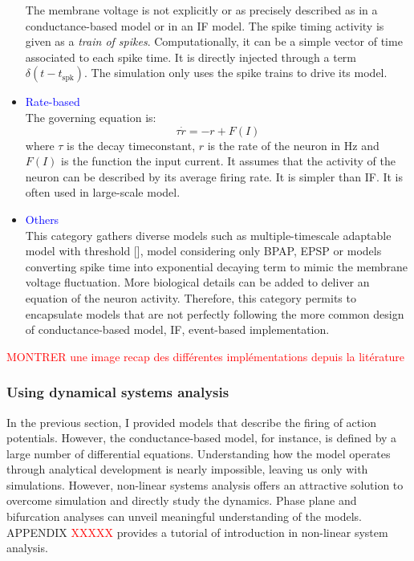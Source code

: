 \begin{itemize}
The membrane voltage is not explicitly or as precisely described as in a conductance-based model or in an \acrshort{IF} model. The spike timing activity is given as a \textit{train of spikes}. Computationally, it can be a simple vector of time associated to each spike time. It is directly injected through a term $\delta(t-t_{\mathrm{spk}})$. The simulation only uses the spike trains to drive its model. 
\item \textcolor{blue}{Rate-based}\\
The governing equation is: 
$$ \tau \dot{r} = - r + F(I)$$
where $\tau$ is the decay timeconstant, $r$ is the rate of the neuron in Hz and $F(I)$ is the function the input current. It assumes that the activity of the neuron can be described by its average firing rate. It is simpler than \acrshort{IF}. It is often used in large-scale model.
\item \textcolor{blue}{Others}\\
This category gathers diverse models such as multiple-timescale adaptable model with threshold [\cite{lappalainen_theoretical_2019}], model considering only \acrfull{BPAP}, \acrshort{EPSP} or models converting spike time into exponential decaying term to mimic the membrane voltage fluctuation. More biological details can be added to deliver an equation of the neuron activity. Therefore, this category permits to encapsulate models that are not perfectly following the more common design of conductance-based model, \acrshort{IF}, event-based implementation.
\end{itemize}

\textcolor{red}{MONTRER une image recap des différentes implémentations depuis la litérature }

\subsubsection{Using dynamical systems analysis}
In the previous section, I provided models that describe the firing of action potentials. However, the conductance-based model, for instance, is defined by a large number of differential equations. Understanding how the model operates through analytical development is nearly impossible, leaving us only with simulations. However, non-linear systems analysis offers an attractive solution to overcome simulation and directly study the dynamics. Phase plane and bifurcation analyses can unveil meaningful understanding of the models. APPENDIX \textcolor{red}{XXXXX} provides a tutorial of introduction in non-linear system analysis. 


